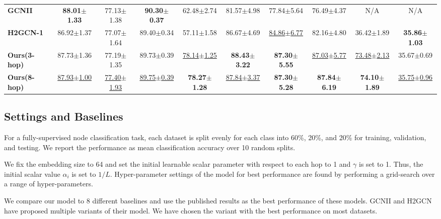 \documentclass[sigconf,natbib=false]{acmart}
\begin{document}
\begin{table*}
{\begin{tabular}{lccccccccc}
\textbf{GCNII}       & \textbf{88.01$\pm$1.33}         & 77.13$\pm$1.38                  & \textbf{90.30$\pm$0.37}         & 62.48$\pm$2.74                   & 81.57$\pm$4.98                   & 77.84$\pm$5.64                   & 76.49$\pm$4.37                   & N/A                     & N/A                      \\
\textbf{H2GCN-1}     & 86.92$\pm$1.37         & 77.07$\pm$1.64         & 89.40$\pm$0.34         & 57.11$\pm$1.58          & 86.67$\pm$4.69          & \uline{84.86$\pm$6.77}  & 82.16$\pm$4.80          & 36.42$\pm$1.89          & \textbf{35.86$\pm$1.03}  \\ 
\hline
\textbf{Ours(3-hop)} & 87.73$\pm$1.36         & 77.19$\pm$1.35         & 89.73$\pm$0.39         & \uline{78.14$\pm$1.25}  & \textbf{88.43$\pm$3.22} & \textbf{87.30$\pm$5.55} & \uline{87.03$\pm$5.77}  & \uline{73.48$\pm$2.13}  & 35.67$\pm$0.69           \\
\textbf{Ours(8-hop)} & \uline{87.93$\pm$1.00} & \uline{77.40$\pm$1.93} & \uline{89.75$\pm$0.39} & \textbf{78.27$\pm$1.28} & \uline{87.84$\pm$3.37}  & \textbf{87.30$\pm$5.28} & \textbf{87.84$\pm$6.19} & \textbf{74.10$\pm$1.89} & \uline{35.75$\pm$0.96}   \\
\bottomrule
\end{tabular}
}
\end{table*}




\subsection{Settings and Baselines}

For a fully-supervised node classification task, each dataset is split evenly for each class into 60\%, 20\%, and 20\% for training, validation, and testing. We report the performance as mean classification accuracy over 10 random splits.

We fix the embedding size to 64 and set the initial learnable scalar parameter with respect to each hop to 1 and $\gamma$ is set to 1. Thus, the initial scalar value $\alpha_i$ is set to $1/L$. Hyper-parameter settings of the model for best performance are found by performing a grid-search over a range of hyper-parameters. 


We compare our model to 8 different baselines and use the published results as the best performance of these models. GCNII \cite{chen_simple_2020} and H2GCN \cite{zhu_beyond_2020} have proposed multiple variants of their model. We have chosen the variant with the best performance on most datasets. 
\end{document}
